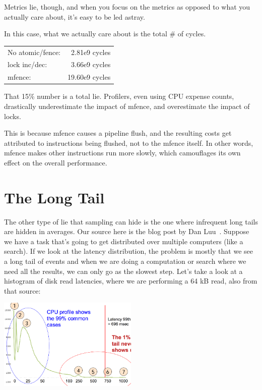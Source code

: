 Metrics lie, though, and when you focus on the metrics as opposed to what you
actually care about, it's easy to be led astray.

In this case, what we actually care about is the total \# of cycles.

    \begin{tabular}{lr}
    No atomic/fence:& 2.81e9 cycles\\
    lock inc/dec: & 3.66e9 cycles\\
    mfence: & 19.60e9 cycles
    \end{tabular}

That 15\% number is a total lie.
Profilers, even using CPU expense counts, drastically underestimate the impact of mfence,
and overestimate the impact of locks.

This is because mfence causes a pipeline flush, and the resulting 
costs get attributed to instructions being flushed, not to the mfence itself. In other
words, mfence makes other instructions run more slowly, which camouflages its own effect
on the overall performance.


\section*{The Long Tail}

The other type of lie that sampling can hide is the one where infrequent long tails are hidden in averages.
Our source here is the blog post by Dan Luu~\cite{perf-tracing}. Suppose we have a task that's going to get distributed over multiple computers (like a search). If we look at the latency distribution, the problem is mostly that we see a long tail of events and when we are doing a computation or search where we need all the results, we can only go as the slowest step. Let's take a look at a histogram of disk read latencies, where we are performing a 64 kB read, also from that source:

\begin{center}
	\includegraphics[width=0.5\textwidth]{images/disk_tail.png}
\end{center}

